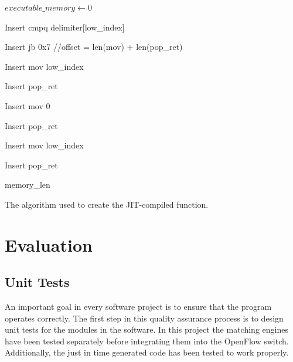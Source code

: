 \documentclass[a4paper,
		12pt,
		parskip=full,
		titlepage
		]{scrartcl}
\begin{document}
\begin{algorithm}
\begin{algorithmic}
    
    
        \State $executable\_memory \gets 0$
        
        
    \EndIf
    
    
        Insert cmpq delimiter[low\_index]
        
        Insert jb 0x7 //offset = len(mov) + len(pop\_ret)
        
        Insert mov low\_index
        
        Insert pop\_ret
        
        
            Insert mov 0
            
            Insert pop\_ret
            
        \Else
            
            Insert mov low\_index
            
            Insert pop\_ret
            
        \EndIf
        
        \Return memory\_len
    \EndIf
\EndFunction
\end{algorithmic}
\caption{The algorithm used to create the JIT-compiled function.}
\label{alg:jit}
\end{algorithm}

\section{Evaluation}
\subsection{Unit Tests}
An important goal in every software project is to ensure that the program operates correctly.
The first step in this quality assurance process is to design unit tests for the modules in the software.
In this project the matching engines have been tested separately before integrating them into the OpenFlow switch.
Additionally, the just in time generated code has been tested to work properly.
\end{document}
